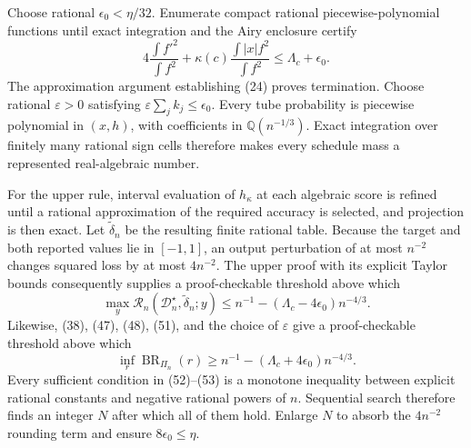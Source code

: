 Choose rational \(\epsilon_0<\eta/32\).  Enumerate compact rational piecewise-polynomial functions until exact integration and the Airy enclosure certify
\[
4\frac{\int f'^2}{\int f^2}
+\kappa(c)\frac{\int|x|f^2}{\int f^2}
\le\Lambda_c+\epsilon_0.
\tag{51}
\]
The approximation argument establishing (24) proves termination.  Choose rational \(\varepsilon>0\) satisfying \(\varepsilon\sum_jk_j\le\epsilon_0\).  Every tube probability is piecewise polynomial in \((x,h)\), with coefficients in \(\mathbb Q(n^{-1/3})\).  Exact integration over finitely many rational sign cells therefore makes every schedule mass a represented real-algebraic number.

For the upper rule, interval evaluation of \(h_\kappa\) at each algebraic score is refined until a rational approximation of the required accuracy is selected, and projection is then exact.  Let \(\widetilde\delta_n\) be the resulting finite rational table.  Because the target and both reported values lie in \([-1,1]\), an output perturbation of at most \(n^{-2}\) changes squared loss by at most \(4n^{-2}\).  The upper proof with its explicit Taylor bounds consequently supplies a proof-checkable threshold above which
\[
\max_y\mathcal R_n(\mathcal D_n^\star,\widetilde\delta_n;y)
\le n^{-1}-(\Lambda_c-4\epsilon_0)n^{-4/3}.
\tag{52}
\]
Likewise, (38), (47), (48), (51), and the choice of \(\varepsilon\) give a proof-checkable threshold above which
\[
\inf_r\operatorname{BR}_{\Pi_n}(r)
\ge n^{-1}-(\Lambda_c+4\epsilon_0)n^{-4/3}.
\tag{53}
\]
Every sufficient condition in (52)--(53) is a monotone inequality between explicit rational constants and negative rational powers of \(n\).  Sequential search therefore finds an integer \(N\) after which all of them hold.  Enlarge \(N\) to absorb the \(4n^{-2}\) rounding term and ensure \(8\epsilon_0\le\eta\).

